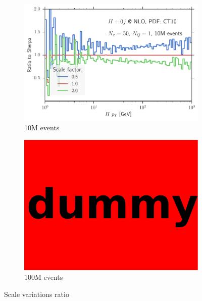 \begin{figure}
\centering
\begin{subfigure}[]{0.49\textwidth}
	\includegraphics[width=\textwidth]{images/plot_scalesvar_ratio_hpt.pdf}
	\caption{10M events}
\end{subfigure}
\hfill
\begin{subfigure}[]{0.49\textwidth}
	\includegraphics[width=\textwidth]{images/dummy.pdf}
	\caption{100M events}
\end{subfigure}
\caption{Scale variations ratio}
\end{figure}
%
